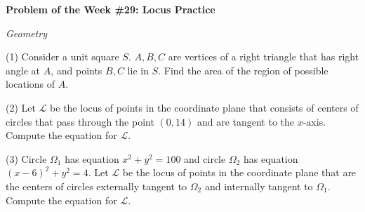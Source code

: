 \begin{potw}\vspace{5pt}
{\large\textbf{Problem of the Week \#29: Locus Practice}}\vspace{5pt}

\textit{Geometry}\V

(1) Consider a unit square $S$. $A, B, C$ are vertices of a right triangle that has right angle at $A$, and points $B, C$ lie in $S$. Find the area of the region of possible locations of $A$.\V

(2) Let $\mathcal{L}$ be the locus of points in the coordinate plane that consists of centers of circles that pass through the point $(0,14)$ and are tangent to the $x$-axis. Compute the equation for $\mathcal{L}$.\V

(3) Circle $\Omega_1$ has equation $x^2+y^2=100$ and circle $\Omega_2$ has equation $(x-6)^2+y^2=4$. Let $\mathcal{L}$ be the locus of points in the coordinate plane that are the centers of circles externally tangent to $\Omega_2$ and internally tangent to $\Omega_1$. Compute the equation for $\mathcal{L}$.
\end{potw}\V


